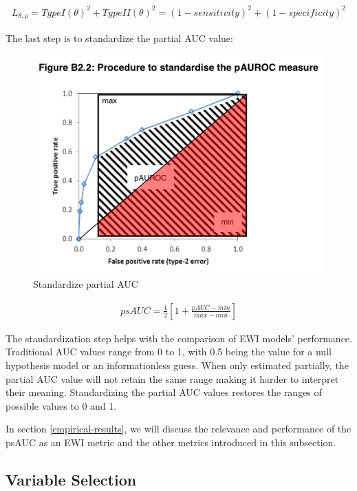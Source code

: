 \documentclass[
  12pt,
]{article}
\begin{document}
\begin{align*}
L_{\theta,\rho}= TypeI(\theta)^2 + TypeII(\theta)^2 = (1 - sensitivity)^2 + (1 - specificity)^2
\end{align*}

The last step is to standardize the partial AUC value:

\begin{figure}

{\centering \includegraphics[width=0.7\linewidth]{../metadata/pAUC} 

}

\caption{Standardize partial AUC}\label{fig:psAUCfig}
\end{figure}

\begin{align} \label{eq:psAUCeq}
psAUC = \frac{1}{2}\left[ 1+ \frac{pAUC - min}{max - min}\right]
\end{align}

The standardization step helps with the comparison of EWI models' performance. Traditional AUC values range from 0 to 1, with 0.5 being the value for a null hypothesis model or an informationless guess. When only estimated partially, the partial AUC value will not retain the same range making it harder to interpret their meaning. Standardizing the partial AUC values restores the ranges of possible values to 0 and 1.

In section \ref{empirical-results}, we will discuss the relevance and performance of the psAUC as an EWI metric and the other metrics introduced in this subsection.

\hypertarget{modelselection}{%
\subsection{Variable Selection}\label{modelselection}}
\end{document}
